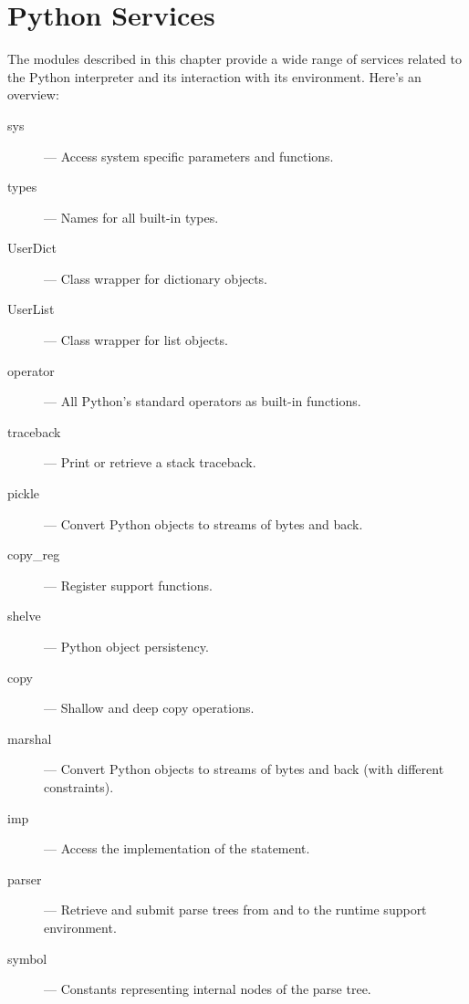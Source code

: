 \chapter{Python Services}
\label{python}

The modules described in this chapter provide a wide range of services
related to the Python interpreter and its interaction with its
environment.  Here's an overview:

\begin{description}

\item[sys]
--- Access system specific parameters and functions.

\item[types]
--- Names for all built-in types.

\item[UserDict]
--- Class wrapper for dictionary objects.

\item[UserList]
--- Class wrapper for list objects.

\item[operator]
--- All Python's standard operators as built-in functions.

\item[traceback]
--- Print or retrieve a stack traceback.

\item[pickle]
--- Convert Python objects to streams of bytes and back.

\item[copy_reg]
--- Register  support functions.

\item[shelve]
--- Python object persistency.

\item[copy]
--- Shallow and deep copy operations.

\item[marshal]
--- Convert Python objects to streams of bytes and back (with
different constraints).

\item[imp]
--- Access the implementation of the  statement.

\item[parser]
--- Retrieve and submit parse trees from and to the runtime support
environment.

\item[symbol]
--- Constants representing internal nodes of the parse tree.


\end{description}
